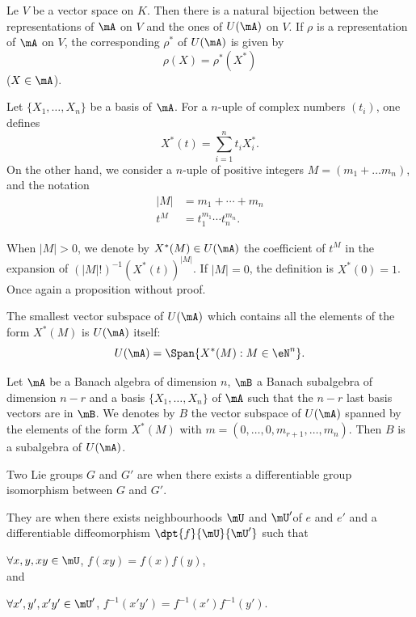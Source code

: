 \begin{proposition}
	Le $V$ be a vector space on $K$. Then there is a natural bijection between the representations of $\mA$ on $V$ and the ones of $U(\mA)$ on $V$. If $\rho$ is a representation of $\mA$ on $V$, the corresponding $\rho^*$ of $U(\mA)$ is given by
	\[
		\rho(X)=\rho^*(X^*)
	\]
	($X\in\mA$).
\end{proposition}

Let $\{X_1,\ldots,X_n\}$ be a basis of $\mA$. For a $n$-uple of complex numbers $(t_i)$, one defines
\begin{equation}
	X^*(t)=\sum_{i=1}^nt_iX^*_i.
\end{equation}
On the other hand, we consider a $n$-uple of positive integers $M=(m_1+\ldots m_n)$, and the notation
\begin{equation}
	\begin{split}
		|M| & =m_1+\cdots+m_n             \\
		t^M & =t_1^{m_1}\cdots t_n^{m_n}.
	\end{split}
\end{equation}

When $|M|>0$, we denote by $X^*(M)\in U(\mA)$ the coefficient of $t^M$ in the expansion of $(|M|!)^{-1} (X^*(t))^{|M|}$. If $|M|=0$, the definition is $X^*(0)=1$. Once again a proposition without proof.

\begin{proposition}
	The smallest vector subspace of $U(\mA)$ which contains all the elements of the form $X^*(M)$ is $U(\mA)$ itself:
	\[
		U(\mA)=\Span\{ X^*(M):M\in \eN^n \}.
	\]
\end{proposition}

\begin{corollary} \label{cor:/24}
	Let $\mA$ be a Banach algebra of dimension $n$, $\mB$ a Banach subalgebra of dimension $n-r$ and a basis $\{X_1,\ldots,X_n\}$ of $\mA$ such that the $n-r$ last basis vectors are in $\mB$. We denotes by $B$ the vector subspace of $U(\mA)$ spanned by the elements of the form $X^*(M)$ with $m=(0,\ldots,0,m_{r+1},\ldots,m_n)$. Then $B$ is a subalgebra of $U(\mA)$.
\end{corollary}

\begin{definition}
	Two Lie groups $G$ and $G'$ are  when there exists a differentiable group isomorphism between $G$ and $G'$.

	They are  when there exists neighbourhoods $\mU$ and $\mU'$of $e$ and $e'$ and a differentiable diffeomorphism $\dpt{f}{\mU}{\mU'}$ such that

	$\forall x,y,xy\in\mU$, $f(xy)=f(x)f(y)$, \\and

	$\forall x',y',x'y'\in\mU'$, $f^{-1}(x'y')=f^{-1}(x')f^{-1}(y')$.
\end{definition}

